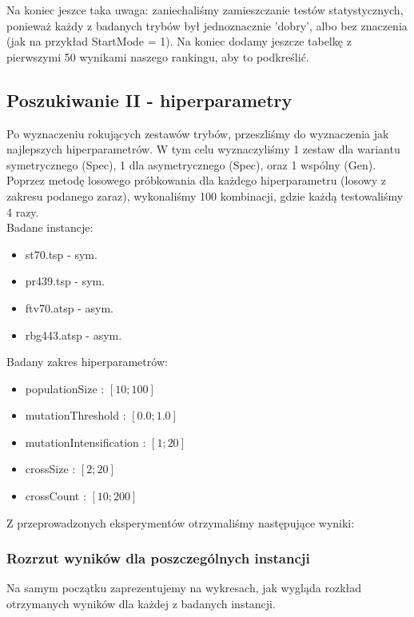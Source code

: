 \documentclass{article}
\begin{document}
Na koniec jeszce taka uwaga: zaniechaliśmy zamieszczanie testów statystycznych, ponieważ każdy z badanych trybów był jednoznacznie 'dobry', albo bez znaczenia (jak na przykład StartMode = 1). Na koniec dodamy jeszcze tabelkę z pierwszymi 50 wynikami naszego rankingu, aby to podkreślić.

\newpage
\subsection{Poszukiwanie II - hiperparametry}
Po wyznaczeniu rokujących zestawów trybów, przeszliśmy do wyznaczenia jak najlepszych hiperparametrów. W tym celu wyznaczyliśmy 1 zestaw dla wariantu symetrycznego (Spec), 1 dla asymetrycznego (Spec), oraz 1 wspólny (Gen).\\
Poprzez metodę losowego próbkowania dla każdego hiperparametru (losowy z zakresu podanego zaraz), wykonaliśmy 100 kombinacji, gdzie każdą testowaliśmy 4 razy.\\
Badane instancje:
\begin{itemize}
	\item st70.tsp - sym.
	\item pr439.tsp - sym.
	\item ftv70.atsp - asym.
	\item rbg443.atsp - asym.
\end{itemize}
Badany zakres hiperparametrów:
\begin{itemize}
	\item populationSize : $[10 ; 100]$
	\item mutationThreshold : $[0.0 ; 1.0]$
	\item mutationIntensification : $[1 ; 20]$
	\item crossSize : $[2 ; 20]$
	\item crossCount : $[10 ; 200]$
\end{itemize}
Z przeprowadzonych eksperymentów otrzymaliśmy następujące wyniki:

\subsubsection{Rozrzut wyników dla poszczególnych instancji}
Na samym początku zaprezentujemy na wykresach, jak wygląda rozkład otrzymanych wyników dla każdej z badanych instancji.
\end{document}

